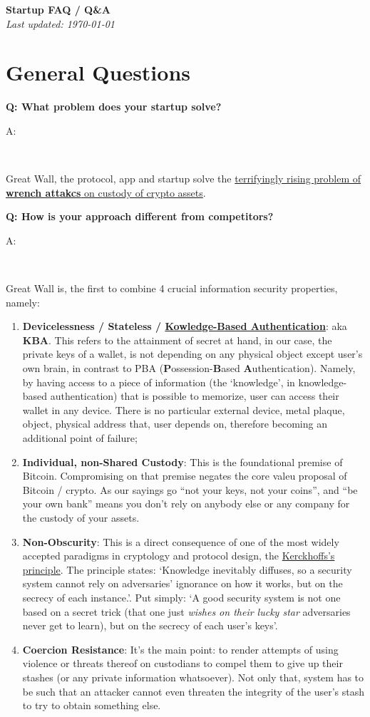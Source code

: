 \documentclass[12pt,a4paper]{article}
\newenvironment{question}[1]{%
  \vspace{0.8em}\noindent\textbf{Q: #1}\par
  \vspace{0.2em}\noindent\begin{itshape}A:\end{itshape}~%
}{\vspace{0.8em}}
\newcommand{\theproblem}{https://x.com/search?q=jameson\%20lopp\%20wrench\%20attack&src=typed_query&f=live}
\newcommand{\kba}{https://en.wikipedia.org/wiki/Knowledge-based_authentication}
\newcommand{\kprinciple}{https://en.wikipedia.org/wiki/Kerckhoffs's_principle}
\begin{document}
\begin{center}
  {\LARGE \textbf{Startup FAQ / Q\&A}}\\[0.3em]
  \textit{Last updated: \today}
\end{center}

\section{General Questions}

\begin{question}{What problem does your startup solve?}
Great Wall, the protocol, app and startup solve the \href{\theproblem}{terrifyingly rising problem of \textbf{wrench attakcs} on custody of crypto assets}.
\end{question}

\begin{question}{How is your approach different from competitors?}
Great Wall is, the first to combine 4 crucial information security properties, namely:
  \begin{enumerate}
    \item \textbf{Devicelessness / Stateless / \href{\kba}{Kowledge-Based Authentication}}: aka \textbf{KBA}. This refers to the attainment of secret at hand, in our case, the private keys of a wallet, is not depending on any physical object except user's own brain, in contrast to PBA (\textbf{P}ossession-\textbf{B}ased \textbf{A}uthentication). Namely, by having access to a piece of information (the `knowledge', in knowledge-based authentication) that is possible to memorize, user can access their wallet in any device. There is no particular external device, metal plaque, object, physical address that, user depends on, therefore becoming an additional point of failure;
    \item \textbf{Individual, non-Shared Custody}: This is the foundational premise of Bitcoin. Compromising on that premise negates the core valeu proposal of Bitcoin / crypto. As our sayings go ``not your keys, not your coins'', and ``be your own bank'' means you don't rely on anybody else or any company for the custody of your assets.
    \item \textbf{Non-Obscurity}: This is a direct consequence of one of the most widely accepted paradigms in cryptology and protocol design, the \href{\kprinciple}{Kerckhoffs's principle}. The principle states: `Knowledge inevitably diffuses, so a security system cannot rely on adversaries' ignorance on how it works, but on the secrecy of each instance.'. Put simply: `A good security system is not one based on a secret trick (that one just \textit{wishes on their lucky star} adversaries never get to learn), but on the secrecy of each user's keys'.
    \item \textbf{Coercion Resistance}: It's the main point: to render attempts of using violence or threats thereof on custodians to compel them to give up their stashes (or any private information whatsoever). Not only that, system has to be such that an attacker cannot even threaten the integrity of the user's stash to try to obtain something else.
  \end{enumerate}
\end{question}
\end{document}
